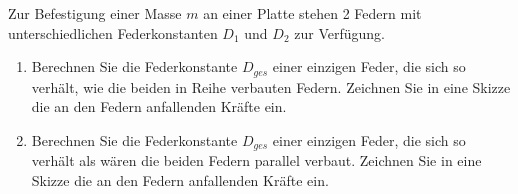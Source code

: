 \begin{ExerciseBlock}
Zur Befestigung einer Masse $m$ an einer Platte stehen 2 Federn mit unterschiedlichen Federkonstanten $D_1$ und $D_2$ zur Verfügung.

\begin{enumerate}
	\item Berechnen Sie die Federkonstante $D_{ges}$ einer einzigen Feder, die sich so verhält, wie die beiden in Reihe verbauten Federn. Zeichnen Sie in eine Skizze die an den Federn anfallenden Kräfte ein.
\begin{center}
\end{center}

	\item Berechnen Sie die Federkonstante $D_{ges}$ einer einzigen Feder, die sich so verhält als wären die beiden Federn parallel verbaut. Zeichnen Sie in eine Skizze die an den Federn anfallenden Kräfte ein.
\begin{center}
\end{center}

\end{enumerate}
\end{ExerciseBlock}
